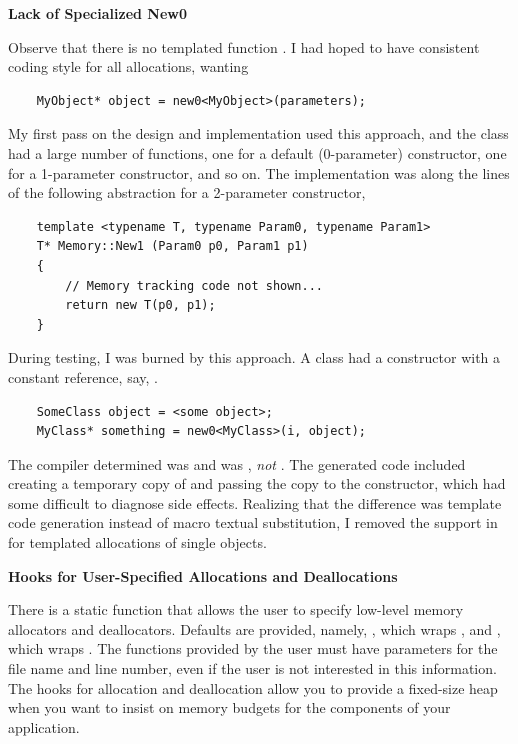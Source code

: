 \documentclass{article}
\begin{document}
\vspace*{0.1in}
{\bf Lack of Specialized New0}

Observe that there is no templated function .  I had hoped to
have consistent coding style for all allocations, wanting
\begin{verbatim}
    MyObject* object = new0<MyObject>(parameters);
\end{verbatim}
My first pass on the design and implementation used this approach, and the
 class had a large number of  functions, one for a
default (0-parameter) constructor, one for a 1-parameter constructor, and so on.
The implementation was along the lines of the following abstraction for a
2-parameter constructor,
\begin{verbatim}
    template <typename T, typename Param0, typename Param1>
    T* Memory::New1 (Param0 p0, Param1 p1)
    {
        // Memory tracking code not shown...
        return new T(p0, p1);
    }
\end{verbatim}
During testing, I was burned by this approach.  A class had a constructor with
a constant reference, say, .
\begin{verbatim}
    SomeClass object = <some object>;
    MyClass* something = new0<MyClass>(i, object);
\end{verbatim}
The compiler determined  was  and  was
, {\em not} .  The generated code included
creating a temporary copy of  and passing the copy to the 
constructor, which had some difficult to diagnose side effects.  Realizing that the
difference was template code generation instead of macro textual substitution, I
removed the support in  for templated allocations of single objects.

\vspace*{0.1in}
{\bf Hooks for User-Specified Allocations and Deallocations}

There is a static function  that allows the user to specify
low-level memory allocators and deallocators.  Defaults are provided, namely,
, which wraps , and
, which wraps .  The functions provided
by the user must have parameters for the file name and line number, even if the user
is not interested in this information.  The hooks for allocation and deallocation
allow you to provide a fixed-size heap when you want to insist on memory budgets
for the components of your application.
\end{document}
